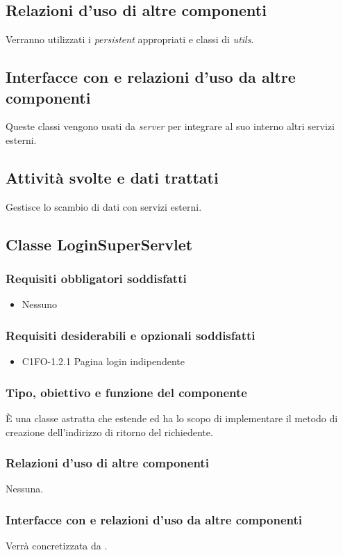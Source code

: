 \subsection*{Relazioni d'uso di altre componenti}
Verranno utilizzati i \emph{persistent} appropriati e classi di \emph{utils}.
\subsection*{Interfacce con e relazioni d'uso da altre componenti}
Queste classi vengono usati da \emph{server} per integrare al suo interno
altri servizi esterni.
\subsection*{Attivit\`a svolte e dati trattati}
Gestisce lo scambio di dati con servizi esterni.


\newpage
\subsection{Classe LoginSuperServlet}
\subsubsection*{Requisiti obbligatori soddisfatti}
\begin{itemize}
    \item Nessuno
\end{itemize}
\subsubsection*{Requisiti desiderabili e opzionali soddisfatti}
\begin{itemize}
    \item C1FO-1.2.1 Pagina login indipendente
\end{itemize}
\subsubsection*{Tipo, obiettivo e funzione del componente}
\`E una classe astratta che estende  ed ha lo scopo di
implementare il metodo di creazione dell'indirizzo di ritorno del richiedente.
\subsubsection*{Relazioni d'uso di altre componenti}
Nessuna.
\subsubsection*{Interfacce con e relazioni d'uso da altre componenti}
Verr\`a concretizzata da .
